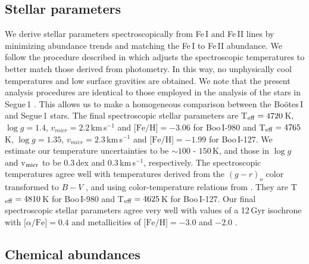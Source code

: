 \documentclass[]{emulateapj}
\begin{document}
\subsection{Stellar parameters}
We derive stellar parameters spectroscopically from Fe\,I and Fe\,II
lines by minimizing abundance trends and matching the Fe\,I to Fe\,II
abundance. We follow the procedure described in \citet{frebel13} which
adjusts the spectroscopic temperatures to better match those derived
from photometry. In this way, no unphysically cool temperatures and
low surface gravities are obtained. We note that the present analysis
procedures are identical to those employed in the analysis of the
stars in Segue\,1 \citep{frebel14}. This allows us to make a
homogeneous comparison between the Bo\"otes\,I and Segue\,1 stars.
The final spectroscopic stellar parameters are T$_{\rm eff}=4720$\,K,
$\log g=1.4$, $v_{micr}=2.2$\,km\,s$^{-1}$ and $\mbox{[Fe/H]}=-3.06$
for Boo\,I-980 and T$_{\rm eff}=4765$\,K, $\log g=1.35$,
$v_{micr}=2.3$\,km\,s$^{-1}$ and $\mbox{[Fe/H]}=-1.99$ for Boo\,I-127.
We estimate our temperature uncertainties to be $\sim100$ - $150$\,K,
and those in $\log g$ and \mbox{v$_{\rm micr}$} to be 0.3\,dex and
0.3\,km\,s$^{-1}$, respectively. The spectroscopic temperatures agree
well with temperatures derived from the $(g-r)_o$ color transformed to
$B-V$ \citep{jordi06}, and using color-temperature relations from
\citet{alonso_giants}. They are T$_{\rm eff}=4810$\,K for Boo\,I-980
and T$_{\rm eff}=4625$\,K for Boo\,I-127. Our final spectroscopic
stellar parameters agree very well with values of a 12\,Gyr isochrone
with $\mbox{[$\alpha$/Fe]}=0.4$ and metallicities of $\mbox{[Fe/H]} =
-3.0$ and $-2.0$ \citep{Y2_iso}.




\subsection{Chemical abundances}

\end{document}

